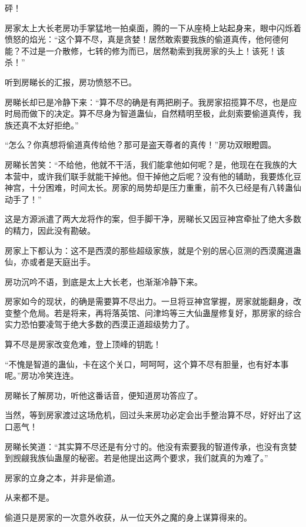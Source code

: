 
\begin{this_body}



砰！

房家太上大长老房功手掌猛地一拍桌面，腾的一下从座椅上站起身来，眼中闪烁着愤怒的焰光：“这个算不尽，真是贪婪！居然敢索要我族的偷道真传，他何德何能？不过是一介散修，七转的修为而已，居然勒索到我房家的头上！该死！该杀！”

听到房睇长的汇报，房功愤怒不已。

房睇长却已是冷静下来：“算不尽的确是有两把刷子。我房家招揽算不尽，也是应时局而做下的决定。算不尽身为智道蛊仙，自然精明至极，此刻索要偷道真传，我族还真不太好拒绝。”

“怎么？你真想将偷道真传给他？那可是盗天尊者的真传！”房功双眼瞪圆。

房睇长苦笑：“不给他，他就不干活，我们能拿他如何呢？是，他现在在我族的大本营中，或许我们联手就能干掉他。但干掉他之后呢？没有他的辅助，我要炼化豆神宫，十分困难，时间太长。房家的局势却是压力重重，前不久已经是有八转蛊仙动手了！”

这是方源派遣了两大龙将作的案，但手脚干净，房睇长又因豆神宫牵扯了绝大多数的精力，因此没有勘破。

房家上下都认为：这不是西漠的那些超级家族，就是个别的居心叵测的西漠魔道蛊仙，亦或者是天庭出手。

房功沉吟不语，到底是太上大长老，也渐渐冷静下来。

房家如今的现状，的确是需要算不尽出力。一旦将豆神宫掌握，房家就能翻身，改变整个危局。若是将来，再将落英馆、问津坞等三大仙蛊屋修复好，那房家的综合实力恐怕要凌驾于绝大多数的西漠正道超级势力了。

算不尽是房家改变危难，登上顶峰的钥匙！

“不愧是智道的蛊仙，卡在这个关口，呵呵呵，这个算不尽有胆量，也有好本事呢。”房功冷笑连连。

房睇长了解房功，听他这番话音，便知道房功答应了。

当然，等到房家渡过这场危机，回过头来房功必定会出手整治算不尽，好好出了这口恶气！

房睇长笑道：“其实算不尽还是有分寸的。他没有索要我的智道传承，也没有贪婪到觊觎我族仙蛊屋的秘密。若是他提出这两个要求，我们就真的为难了。”

房家的立身之本，并非是偷道。

从来都不是。

偷道只是房家的一次意外收获，从一位天外之魔的身上谋算得来的。


\end{this_body}
